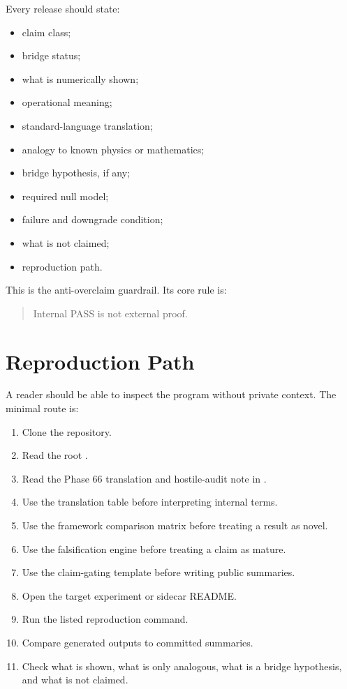 \documentclass[11pt]{article}
\begin{document}
Every release should state:

\begin{itemize}
\item claim class;
\item bridge status;
\item what is numerically shown;
\item operational meaning;
\item standard-language translation;
\item analogy to known physics or mathematics;
\item bridge hypothesis, if any;
\item required null model;
\item failure and downgrade condition;
\item what is not claimed;
\item reproduction path.
\end{itemize}

This is the anti-overclaim guardrail. Its core rule is:

\begin{quote}
Internal PASS is not external proof.
\end{quote}

\section{Reproduction Path}

A reader should be able to inspect the program without private context. The minimal route is:

\begin{enumerate}
\item Clone the repository.
\item Read the root .
\item Read the Phase 66 translation and hostile-audit note in .
\item Use the translation table before interpreting internal terms.
\item Use the framework comparison matrix before treating a result as novel.
\item Use the falsification engine before treating a claim as mature.
\item Use the claim-gating template before writing public summaries.
\item Open the target experiment or sidecar README.
\item Run the listed reproduction command.
\item Compare generated outputs to committed summaries.
\item Check what is shown, what is only analogous, what is a bridge hypothesis, and what is not claimed.
\end{enumerate}
\end{document}
